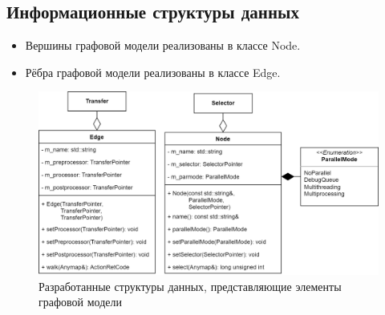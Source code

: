 \subsection{Информационные структуры данных}
\begin{frame}

    \begin{itemize}
        \item Вершины графовой модели реализованы в классе Node.
        \item Рёбра графовой модели реализованы в классе Edge.
    \end{itemize}

    \begin{figure}
        \centering
        \includegraphics[height=0.6\textheight]{images/UML.graphElements.png}
        \caption{Разработанные структуры данных, представляющие элементы графовой модели}
    \end{figure}
\end{frame}

\begin{frame}



\end{frame}
